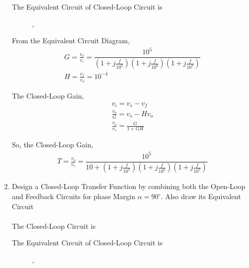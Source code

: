 \begin{enumerate}[label=\thesection.\arabic*.,ref=\thesection.\theenumi]
The Equivalent Circuit of Closed-Loop Circuit is
\begin{figure}[ht!]
	\begin{center}
		\resizebox{\columnwidth}{!}{}
	\end{center},
	\caption{}
	\label{fig:ee18btech11014_Closed-Loop Equivalent Circuit alpha=45}
\end{figure}

From the Equivalent Circuit Diagram,
\begin{align}
G = \frac{v_{o}}{v_{i}} = \dfrac{10^5}{\left(1+j\frac{f}{10^{5}}\right)\left(1+j\frac{f}{10^{6}}\right)\left(1+j\frac{f}{10^{7}}\right)}\\
H = \frac{v_{f}}{v_{o}} = 10^{-4}
\end{align}

The Closed-Loop Gain,
\begin{align}
v_{i} = v_{s} - v_{f}\\
\frac{v_{o}}{G} = v_{s} - Hv_{o}\\
\frac{v_{o}}{v_{s}} = \frac{G}{1+GH}
\end{align}

So, the Closed-Loop Gain,
\begin{align}
T = \frac{v_{o}}{v_{s}} = \dfrac{10^5}{10 + \left(1+j\frac{f}{10^{5}}\right)\left(1+j\frac{f}{10^{6}}\right)\left(1+j\frac{f}{10^{7}}\right)}
\end{align}

\item  Design a Closed-Loop Transfer Function by combining both the Open-Loop and Feedback Circuits for phase Margin $\alpha=90^{\circ}$. Also draw its Equivalent Circuit\\
\solution\\
The Closed-Loop Circuit is
\begin{figure}[ht!]
	\begin{center}
		\resizebox{\columnwidth}{!}{}
	\end{center}
	\caption{}
	\label{fig:ee18btech11014_Closed-Loop Circuit alpha=90}
\end{figure}

The Equivalent Circuit of Closed-Loop Circuit is
\begin{figure}[ht!]
	\begin{center}
		\resizebox{\columnwidth}{!}{}
	\end{center},
	\caption{}
	\label{fig:ee18btech11014_Closed-Loop Equivalent Circuit alpha=90}
\end{figure}


\end{enumerate}
